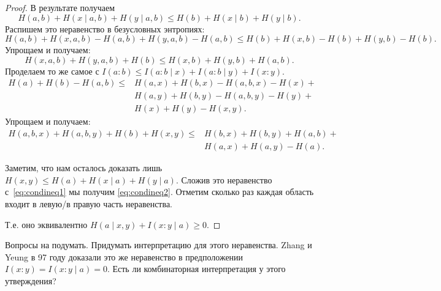 \documentclass[12pt]{article}
\theoremstyle{definition}
\theoremstyle{plain}
\theoremstyle{remark}
\begin{document}
\begin{proof}
    В результате получаем
    \[
        H(a,b) + H(x\mid a,b) + H(y\mid a,b) \le H(b) + H(x\mid b) + H(y\mid b).
    \]
    Распишем это неравенство в безусловных энтропиях:
    \[
        H(a,b) + H(x,a,b) - H(a,b) + H(y, a,b) - H(a,b) \le H(b) + H(x, b) - H(b) + H(y, b) - H(b).
    \]
    Упрощаем и получаем:
    \begin{equation}\label{eq:condineq1}
        H(x,a,b) + H(y,a,b) + H(b) \le H(x,b) + H(y,b) + H(a,b).
    \end{equation}
    Проделаем то же самое с 
    $I(a:b)\le I(a:b\mid x) + I(a:b\mid y) + I(x:y)$.
    \begin{equation*}
        \begin{array}{ll}
        H(a) + H(b) - H(a,b) \le 
        & H(a,x) + H(b,x) - H(a,b,x) - H(x) +\mbox{} \\
        & H(a,y)+ H(b,y) - H(a,b,y) - H(y) + \mbox{} \\
        & H(x) + H(y) - H(x,y).
        \end{array}
    \end{equation*}
    Упрощаем и получаем:
    \begin{equation}\label{eq:condineq2}
        \begin{array}{ll}
        H(a,b,x) + H(a,b,y) + H(b) + H(x,y) \le 
        & H(b,x) + H(b,y)  + H(a,b) + \mbox{} \\
        & H(a,x) + H(a,y) - H(a).
        \end{array}
    \end{equation}

    Заметим, что нам осталось доказать лишь $H(x,y)\le H(a) + H(x\mid a) + H(y\mid a)$. 
    Сложив это неравенство с~\eqref{eq:condineq1} мы получим \eqref{eq:condineq2}.
    Отметим сколько раз каждая область входит в левую/в правую часть неравенства.
    \begin{center}
    \end{center}
    Т.е. оно эквивалентно $H(a\mid x,y) + I(x:y\mid a) \ge 0$.
\end{proof}
Вопросы на подумать. Придумать интерпретацию для этого неравенства. Zhang и Yeung в 97 году доказали это же
неравенство в предположении $I(x:y) = I(x:y\mid a) = 0$. Есть ли комбинаторная интерпретация у этого
утверждения?
\end{document}
